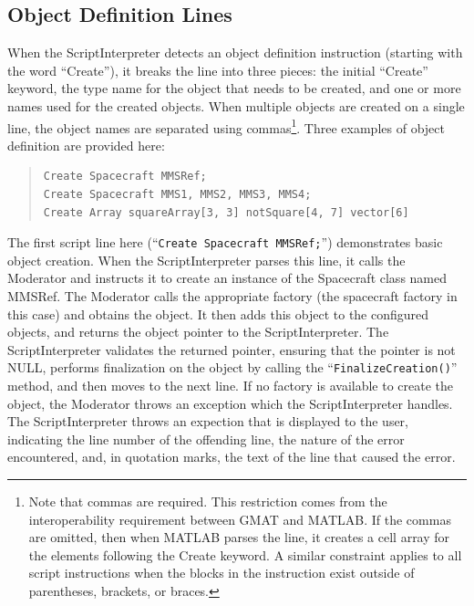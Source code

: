\subsection{\label{section:ParsingObjectDefinitions}Object Definition Lines}

When the ScriptInterpreter detects an object definition instruction (starting with the word
``Create''), it breaks the line into three pieces: the initial ``Create'' keyword, the type name for
the object that needs to be created, and one or more names used for the created objects.  When
multiple objects are created on a single line, the object names are separated using
commas\footnote{Note that commas are required. This restriction comes from the interoperability
requirement between GMAT and MATLAB.  If the commas are omitted, then when MATLAB parses the line,
it creates a cell array for the elements following the Create keyword.  A similar constraint applies
to all script instructions when the blocks in the instruction exist outside of parentheses,
brackets, or braces.}.  Three examples of object definition are provided here:

\begin{quote}
\linenumbers[1]
\begin{verbatim}
Create Spacecraft MMSRef;
Create Spacecraft MMS1, MMS2, MMS3, MMS4;
Create Array squareArray[3, 3] notSquare[4, 7] vector[6]
\end{verbatim}
\end{quote}

\noindent The first script line here (``\texttt{Create Spacecraft MMSRef;}'') demonstrates basic
object creation. When the ScriptInterpreter parses this line, it calls the Moderator and instructs
it to create an instance of the Spacecraft class named MMSRef.  The Moderator calls the appropriate
factory (the spacecraft factory in this case) and obtains the object.  It then adds this object to
the configured objects, and returns the object pointer to the ScriptInterpreter. The
ScriptInterpreter validates the returned pointer, ensuring that the pointer is not NULL, performs
finalization on the object by calling the ``\texttt{FinalizeCreation()}'' method, and then moves to
the next line.  If no factory is available to create the object, the Moderator throws an exception
which the ScriptInterpreter handles.  The ScriptInterpreter throws an expection that is displayed to
the user, indicating the line number of the offending line, the nature of the error encountered,
and, in quotation marks, the text of the line that caused the error.

